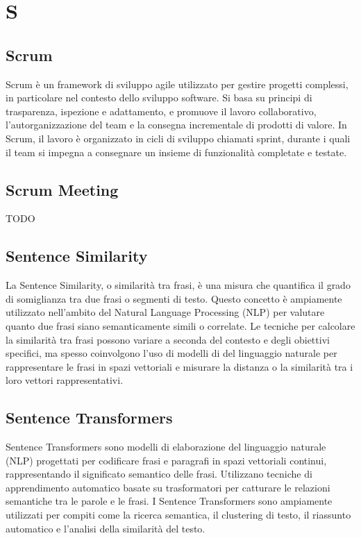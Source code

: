 \section{S}

\vspace{2em}
\subsection*{Scrum}
Scrum è un framework di sviluppo agile utilizzato per gestire progetti complessi, in particolare nel contesto dello sviluppo software. Si basa su principi di trasparenza, ispezione e adattamento, e promuove il lavoro collaborativo, l'autorganizzazione del team e la consegna incrementale di prodotti di valore. In Scrum, il lavoro è organizzato in cicli di sviluppo chiamati sprint, durante i quali il team si impegna a consegnare un insieme di funzionalità completate e testate.

\vspace{2em}
\subsection*{Scrum Meeting}
TODO

\vspace{2em}
\subsection*{Sentence Similarity}
La Sentence Similarity, o similarità tra frasi, è una misura che quantifica il grado di somiglianza tra due frasi o segmenti di testo. Questo concetto è ampiamente utilizzato nell'ambito del Natural Language Processing (NLP) per valutare quanto due frasi siano semanticamente simili o correlate. Le tecniche per calcolare la similarità tra frasi possono variare a seconda del contesto e degli obiettivi specifici, ma spesso coinvolgono l'uso di modelli di  del linguaggio naturale per rappresentare le frasi in spazi vettoriali e misurare la distanza o la similarità tra i loro vettori rappresentativi.

\vspace{2em}
\subsection*{Sentence Transformers}
Sentence Transformers sono modelli di elaborazione del linguaggio naturale (NLP) progettati per codificare frasi e paragrafi in spazi vettoriali continui, rappresentando il significato semantico delle frasi. Utilizzano tecniche di apprendimento automatico basate su trasformatori per catturare le relazioni semantiche tra le parole e le frasi. I Sentence Transformers sono ampiamente utilizzati per compiti come la ricerca semantica, il clustering di testo, il riassunto automatico e l'analisi della similarità del testo.

